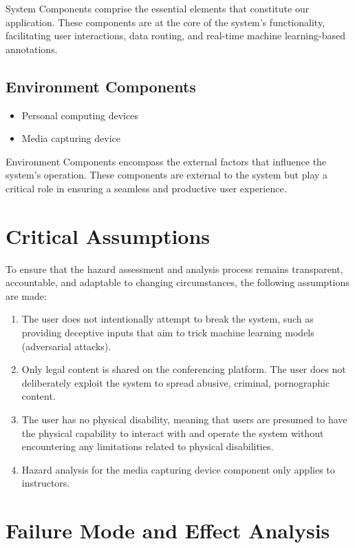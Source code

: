 \documentclass{article}
\begin{document}
System Components comprise the essential elements that constitute our
application. These components are at the core of the system's functionality,
facilitating user interactions, data routing, and real-time machine
learning-based annotations.

\subsection{Environment Components}

\begin{itemize}
\item Personal computing devices
\item Media capturing device
\end{itemize}

Environment Components encompass the external factors that influence the
system's operation. These components are external to the system but play a
critical role in ensuring a seamless and productive user experience.

\section{Critical Assumptions}

To ensure that the hazard assessment and analysis process remains transparent,
accountable, and adaptable to changing circumstances, the following assumptions
are made:

\begin{enumerate}
\item The user does not intentionally attempt to break the system, such as
  providing deceptive inputs that aim to trick machine learning models
  (adversarial attacks).
\item Only legal content is shared on the conferencing platform. The user does not
  deliberately exploit the system to spread abusive, criminal, pornographic
  content.
\item The user has no physical disability, meaning that users are presumed to have
  the physical capability to interact with and operate the system without
  encountering any limitations related to physical disabilities.
\item Hazard analysis for the media capturing device component only applies to
  instructors.
\end{enumerate}


\section{Failure Mode and Effect Analysis}
\end{document}
